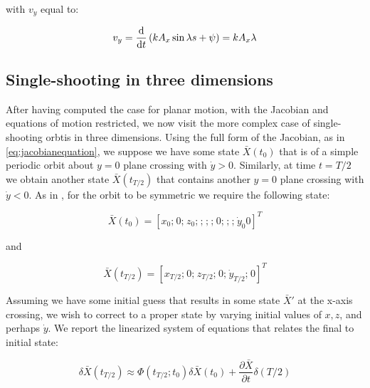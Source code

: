 \noindent with $v_y$ equal to:

\begin{equation}
	v_y = \frac{\textnormal{d}}{\textnormal{d}t} \left(kA_x\sin{\lambda s + \psi}\right) = kA_x\lambda
\end{equation}

\subsection{Single-shooting in three dimensions}

After having computed the case for planar motion, with the Jacobian and equations of motion restricted, we now visit the more complex case of single-shooting orbtis in three dimensions. Using the full form of the Jacobian, as in \ref{eq:jacobianequation}, we suppose we have some state $\bar X\left(t_0\right)$ that is of a simple periodic orbit about $y = 0$ plane crossing with $\dot{y} > 0$. Similarly, at time $t = T/2$ we obtain another state $\bar X\left(t_{T/2}\right)$ that contains another $y = 0$ plane crossing with $\dot{y} < 0$. As in \cite{Parker2014}, for the orbit to be symmetric we require the following state:

\[
	\bar X\left(t_0\right) = [x_0;\hspace{1pt} 0;\hspace{1pt} z_0; \hspace{1pt};\hspace{1pt};\hspace{1pt};\hspace{1pt} 0;\hspace{1pt};\hspace{1pt}; \hspace{1pt} \dot{y}_0 0]^T
\]

and

\[
		\bar X\left(t_{T/2}\right) = [x_{T/2};\hspace{1pt} 0;\hspace{1pt} z_{T/2};\hspace{1pt} 0; \hspace{1pt}\dot{y}_{T/2};\hspace{1pt} 0]^T
\]

\noindent Assuming we have some initial guess that results in some state $\bar X\prime$ at the x-axis crossing, we wish to correct to a proper state by varying initial values of $x, z$, and perhaps $\dot{y}$. We report the linearized system of equations that relates the final to initial state:

\[
	\delta \bar X\left(t_{T/2}\right) \approx \Phi\left(t_{T/2};t_0\right) \delta\bar X\left(t_0\right) + \frac{\partial\bar X}{\partial t} \delta\left(T/2\right)
\]

